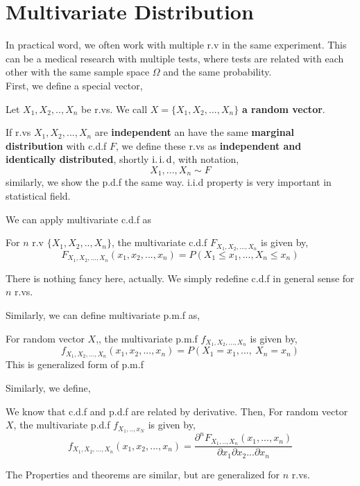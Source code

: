 \section{Multivariate Distribution}
In practical word, we often work with multiple r.v in the same experiment. This can be a medical research with multiple tests, where tests are related with each other with the same sample space $\Omega$ and the same probability.\\
First, we define a special vector,
\begin{definition}
    Let $X_1,X_2,..,X_n$ be r.vs. We call $X = \{ X_1, X_2, ... ,X_n\}$ \textbf{a random vector}.
\end{definition}
\begin{definition}
    If r.vs $X_1,X_2,...,X_n$ are \textbf{independent} an have the same \textbf{marginal distribution} with c.d.f $F$, we define these r.vs as \textbf{independent and identically distributed}, shortly $\operatorname{i.i.d}$, with notation,
    \[X_1,...,X_n \sim F\]
    similarly, we show the p.d.f the same way. i.i.d property is very important in statistical field.
\end{definition}
We can apply multivariate c.d.f as
\begin{definition}
    For $n$  r.v $\{ X_1,X_2,..,X_n \}$, the multivariate c.d.f $F_{X_1,X_2,...,X_n}$ is given by,
    \[F_{X_1,X_2,...,X_n}(x_1,x_2,...,x_n) = P(X_1 \le x_1,...,X_n \le x_n) \]
\end{definition}
There is nothing fancy here, actually. We simply redefine c.d.f in general sense for $n$ r.vs.
\par
Similarly, we can define multivariate p.m.f as,
\begin{definition} For random vector $X$,, the multivariate p.m.f  $f_{X_1,X_2,...,X_n}$ is given by,
    \[ f_{X_1,X_2,...,X_n}(x_1,x_2,...,x_n) = P(X_1=x_1 ,...,  \ X_n = x_n) \]
    This is generalized form of p.m.f

\end{definition}
Similarly, we define,
\begin{definition}
    We know that c.d.f and p.d.f are related by derivative. Then,
    For random vector $X$, the multivariate p.d.f $f_{X_1,..,x_N}$ is given by,
    \[f_{X_1,X_2,...,X_n}(x_1,x_2,...,x_n) = \frac{{\partial}^nF_{X_1,..,X_n}(x_1,...,x_n)}{\partial x_1\partial x_2...\partial x_n}\]
\end{definition}

The Properties and theorems are similar, but are generalized for $n$ r.vs.

